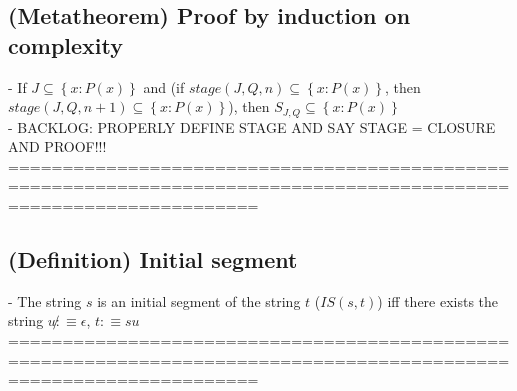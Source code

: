 \documentclass{book}
\newcommand{\is}{:\equiv}
\newcommand{\inot}{\not}
\newcommand{\set}[1]{\left\{ #1 \right\}}
\begin{document}
\subsection{(Metatheorem) Proof by induction on complexity} %
	- If $J \subseteq \set{x: P(x)}$ and (if $stage(J, Q, n) \subseteq \set{x: P(x)}$, then $stage(J, Q, n+1) \subseteq \set{x: P(x)}$), then $S_{J, Q} \subseteq \set{x: P(x)}$ \\
	- BACKLOG: PROPERLY DEFINE STAGE AND SAY STAGE = CLOSURE AND PROOF!!! \\
	===================================================================================================================
\subsection{(Definition) Initial segment} %
	- The string $s$ is an initial segment of the string $t$ ($IS(s, t)$) iff there exists the string $u \inot \is \epsilon$, $t \is s u$ \\
	===================================================================================================================
\end{document}
